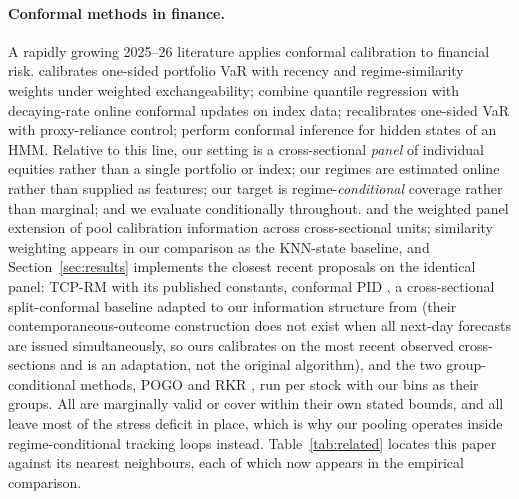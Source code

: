 \paragraph{Conformal methods in finance.}
A rapidly growing 2025--26 literature applies conformal calibration to
financial risk. \citet{schmitt2026taming} calibrates one-sided portfolio
VaR with recency and regime-similarity weights under weighted
exchangeability; \citet{aich2025temporal} combine quantile regression with
decaying-rate online conformal updates on index data;
\citet{proxyvar2026} recalibrates one-sided VaR with proxy-reliance
control; \citet{su2024adaptive} perform conformal inference for hidden
states of an HMM. Relative to this line, our setting is a cross-sectional
\emph{panel} of individual equities rather than a single portfolio or
index; our regimes are estimated online rather than supplied as features;
our target is regime-\emph{conditional} coverage rather than marginal; and
we evaluate conditionally throughout. \citet{lin2022conformal} and the
weighted panel extension of \citet{wtqa2026panel} pool calibration
information across cross-sectional units; similarity weighting appears in
our comparison as the KNN-state baseline, and Section~\ref{sec:results}
implements the closest recent proposals on the identical panel:
TCP-RM \citep{aich2025temporal} with its published constants, conformal
PID \citep{angelopoulos2023conformal}, a cross-sectional
split-conformal baseline adapted to our information structure from
\citet{wtqa2026panel} (their contemporaneous-outcome construction does
not exist when all next-day forecasts are issued simultaneously, so
ours calibrates on the most recent observed cross-sections and is an
adaptation, not the original algorithm), and the two group-conditional
methods, POGO \citep{bharti2026parameterfree} and RKR
\citep{ramalingam2025noregret}, run per stock with our bins as their
groups. All are marginally valid or cover within their own stated
bounds, and all leave most of the stress deficit in place, which is why
our pooling operates inside regime-conditional tracking loops instead.
Table~\ref{tab:related} locates this paper against its nearest
neighbours, each of which now appears in the empirical comparison.

